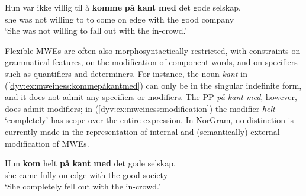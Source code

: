 \documentclass[output=paper]{langsci/langscibook}
\begin{document}

\ea\label{dyv:ex:mweiness:kommepåkantmed}
\gll Hun var ikke villig til å \textbf{komme} \textbf{på} \textbf{kant} \textbf{med} det gode selskap. \\
     she was not willing to to come on edge with the good company \\
\glt `She was not willing to fall out with the in-crowd.’
\z

Flexible MWEs are often also morphosyntactically restricted, with constraints on grammatical features, on the modification of component words, and on specifiers such as quantifiers and determiners.
For instance, the noun \emph{kant} in (\ref{dyv:ex:mweiness:kommepåkantmed}) can only be in the singular indefinite form, and it does not admit any specifiers or modifiers.
The \textsf{PP} \emph{på kant med}, however, does admit modifiers; in (\ref{dyv:ex:mweiness:modification}) the modifier \emph{helt} `completely' has scope over the entire expression.
In NorGram, no distinction is currently made in the representation of internal and (semantically) external modification of MWEs. 

\ea\label{dyv:ex:mweiness:modification}
\gll Hun \textbf{kom} helt \textbf{på} \textbf{kant} \textbf{med} det gode selskap. \\
she came fully on edge with the good society \\
\glt `She completely fell out with the in-crowd.' \\
\z
\end{document}

